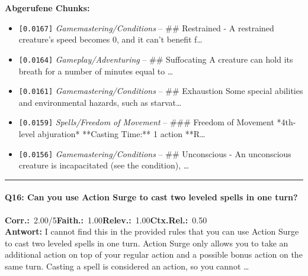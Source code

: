 \noindent\textbf{Abgerufene Chunks:}
\begin{itemize}[noitemsep, topsep=2pt]
  \item[\textbf{\#1}] \texttt{[0.0167]} \textit{Gamemastering/Conditions} -- \#\# Restrained  - A restrained creature's speed becomes 0, and it can't benefit f\ldots
  \item[\textbf{\#2}] \texttt{[0.0164]} \textit{Gameplay/Adventuring} -- \#\# Suffocating  A creature can hold its breath for a number of minutes equal to \ldots
  \item[\textbf{\#3}] \texttt{[0.0161]} \textit{Gamemastering/Conditions} -- \#\# Exhaustion  Some special abilities and environmental hazards, such as starvat\ldots
  \item[\textbf{\#4}] \texttt{[0.0159]} \textit{Spells/Freedom of Movement} -- \#\#\# Freedom of Movement  *4th-level abjuration*  **Casting Time:** 1 action  **R\ldots
  \item[\textbf{\#5}] \texttt{[0.0156]} \textit{Gamemastering/Conditions} -- \#\# Unconscious  - An unconscious creature is incapacitated (see the condition), \ldots
\end{itemize}
\vspace{4pt}
\hrule
\vspace{6pt}

\paragraph{Q16: Can you use Action Surge to cast two leveled spells in one turn?}
\noindent \textbf{Corr.:}~2.00/5\quad \textbf{Faith.:}~1.00\quad \textbf{Relev.:}~1.00\quad \textbf{Ctx.Rel.:}~0.50\\

\noindent\textbf{Antwort:} I cannot find this in the provided rules that you can use Action Surge to cast two leveled spells in one turn. Action Surge only allows you to take an additional action on top of your regular action and a possible bonus action on the same turn. Casting a spell is considered an action, so you cannot \ldots

